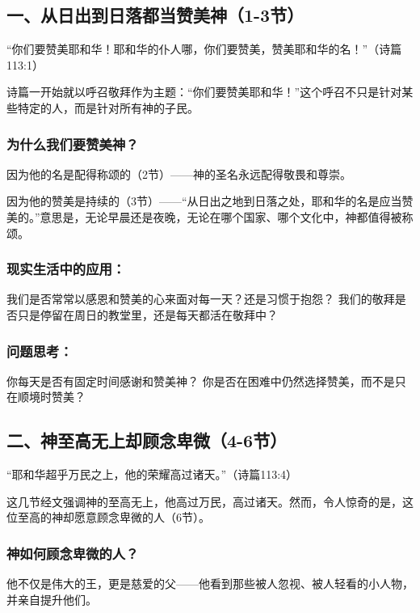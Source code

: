 \documentclass[a4paper, 12pt]{article}
\begin{document}
\subsection*{一、从日出到日落都当赞美神（1-3节）}
“你们要赞美耶和华！耶和华的仆人哪，你们要赞美，赞美耶和华的名！”（诗篇113:1）

诗篇一开始就以呼召敬拜作为主题：“你们要赞美耶和华！”这个呼召不只是针对某些特定的人，而是针对所有神的子民。

\subsubsection*{为什么我们要赞美神？}

\hspace{0.6cm}因为他的名是配得称颂的（2节）——神的圣名永远配得敬畏和尊崇。

因为他的赞美是持续的（3节）——“从日出之地到日落之处，耶和华的名是应当赞美的。”意思是，无论早晨还是夜晚，无论在哪个国家、哪个文化中，神都值得被称颂。

\subsubsection*{现实生活中的应用：}

我们是否常常以感恩和赞美的心来面对每一天？还是习惯于抱怨？
我们的敬拜是否只是停留在周日的教堂里，还是每天都活在敬拜中？
\subsubsection*{问题思考：}

你每天是否有固定时间感谢和赞美神？
你是否在困难中仍然选择赞美，而不是只在顺境时赞美？
\subsection*{二、神至高无上却顾念卑微（4-6节）}
“耶和华超乎万民之上，他的荣耀高过诸天。”（诗篇113:4）

这几节经文强调神的至高无上，他高过万民，高过诸天。然而，令人惊奇的是，这位至高的神却愿意顾念卑微的人（6节）。

\subsubsection*{神如何顾念卑微的人？}

\hspace{0.6cm}他不仅是伟大的王，更是慈爱的父——他看到那些被人忽视、被人轻看的小人物，并亲自提升他们。
\end{document}
